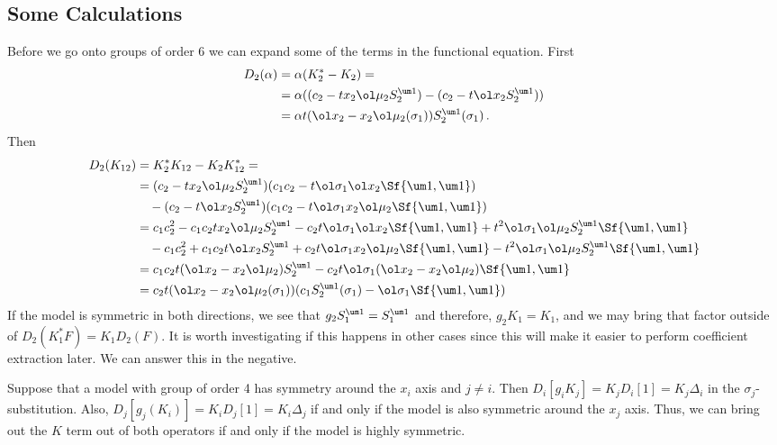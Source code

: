 \subsection{Some Calculations}
Before we go onto groups of order 6 we can expand some of the terms in the functional equation. First
\begin{align}
\begin{split}
	D_2(\alpha) &= \alpha(K_2^\ast -K_2) = \\
			&= \alpha((c_2- tx_2\ol \mu_2 S_2^{\um 1})-(c_2- t\ol x_2 S_2^{\um 1}))\\
			&= \alpha t(\ol x_2 - x_2\ol \mu_2(\sigma_1))S_2^{\um 1}(\sigma_1)\,.
\end{split}
\end{align}
Then
\begin{align}
\begin{split}
	D_2(K_{12}) &=K_2^\ast K_{12}- K_2 K_{12}^\ast = \\
			&=(c_2- tx_2\ol \mu_2 S_2^{\um 1})(c_1c_2-t\ol \sigma_1\ol x_2\Sf{\um 1,\um 1}) \\
			&\quad-(c_2- t\ol x_2 S_2^{\um 1})(c_1c_2-t\ol \sigma_1x_2\ol \mu_2\Sf{\um 1,\um 1})\\
			&=c_1c_2^2-c_1c_2tx_2\ol \mu_2S_2^{\um 1} - c_2t\ol \sigma_1\ol x_2\Sf{\um 1,\um 1}+ t^2\ol \sigma_1\ol \mu_2S_2^{\um 1}\Sf{\um 1,\um 1}\\
			&\quad - c_1c_2^2+c_1c_2t\ol x_2S_2^{\um 1} + c_2t\ol \sigma_1x_2 \ol \mu_2\Sf{\um 1,\um 1}-  t^2\ol \sigma_1\ol \mu_2S_2^{\um 1}\Sf{\um 1,\um 1}\\
			&=c_1c_2t(\ol x_2-x_2\ol \mu_2)S_2^{\um 1} - c_2t\ol \sigma_1(\ol x_2-x_2\ol \mu_2)\Sf{\um 1,\um 1}\\
			&=c_2t(\ol x_2-x_2\ol \mu_2(\sigma_1))(c_1S_2^{\um 1}(\sigma_1) - \ol \sigma_1\Sf{\um 1,\um 1})\\
\end{split}
\end{align}
If the model is symmetric in both directions, we see that $g_2 S_1^{\um 1} = S_1^{\um 1}$ and therefore, $g_2 K_1 = K_1$, and we may bring that factor outside of $D_2(K_1^\ast F) = K_1 D_2(F)$. It is worth investigating if this happens in other cases since this will make it easier to perform coefficient extraction later. We can answer this in the negative.
\begin{prop} Suppose that a model with group of order 4 has symmetry around the $x_i$ axis and $j\neq i$. Then $D_i[g_iK_j] = K_jD_i[1] = K_j \Delta_i$ in the $\sigma_j$-substitution. Also, $D_j[g_j(K_i)] = K_i D_j[1] = K_i \Delta_j$ if and only if the model is also symmetric around the $x_j$ axis. Thus, we can bring out the $K$ term out of both operators if and only if the model is highly symmetric.
\end{prop}
